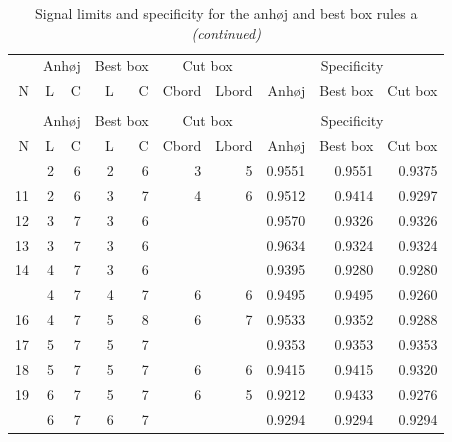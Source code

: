 \begin{Schunk}

\begin{longtable}{rrrrrrrrrr}
\caption{\label{tab:tab1}Signal limits and specificity for the anhøj and best box rules and 
        borders for the cut box rules. N = number of data points in chart.
        L = upper limit for longest run, C = lower limit for number of 
        crossings, Cbord and Lbord = cut box borders to keep.}\\
\toprule
\multicolumn{1}{c}{ } & \multicolumn{2}{c}{Anhøj} & \multicolumn{2}{c}{Best box} & \multicolumn{2}{c}{Cut box} & \multicolumn{3}{c}{Specificity} \\
\cmidrule(l{3pt}r{3pt}){2-3} \cmidrule(l{3pt}r{3pt}){4-5} \cmidrule(l{3pt}r{3pt}){6-7} \cmidrule(l{3pt}r{3pt}){8-10}
N & L & C & L & C & Cbord & Lbord & Anhøj & Best box & Cut box\\
\midrule
\endfirsthead
\caption[]{Signal limits and specificity for the anhøj and best box rules a \textit{(continued)}}\\
\toprule
\multicolumn{1}{c}{ } & \multicolumn{2}{c}{Anhøj} & \multicolumn{2}{c}{Best box} & \multicolumn{2}{c}{Cut box} & \multicolumn{3}{c}{Specificity} \\
\cmidrule(l{3pt}r{3pt}){2-3} \cmidrule(l{3pt}r{3pt}){4-5} \cmidrule(l{3pt}r{3pt}){6-7} \cmidrule(l{3pt}r{3pt}){8-10}
N & L & C & L & C & Cbord & Lbord & Anhøj & Best box & Cut box\\
\midrule
\endhead
\
\endfoot
\bottomrule
\endlastfoot
10 & 2 & 6 & 2 & 6 & 3 & 5 & 0.9551 & 0.9551 & 0.9375\\
11 & 2 & 6 & 3 & 7 & 4 & 6 & 0.9512 & 0.9414 & 0.9297\\
12 & 3 & 7 & 3 & 6 &  &  & 0.9570 & 0.9326 & 0.9326\\
13 & 3 & 7 & 3 & 6 &  &  & 0.9634 & 0.9324 & 0.9324\\
14 & 4 & 7 & 3 & 6 &  &  & 0.9395 & 0.9280 & 0.9280\\
\addlinespace
15 & 4 & 7 & 4 & 7 & 6 & 6 & 0.9495 & 0.9495 & 0.9260\\
16 & 4 & 7 & 5 & 8 & 6 & 7 & 0.9533 & 0.9352 & 0.9288\\
17 & 5 & 7 & 5 & 7 &  &  & 0.9353 & 0.9353 & 0.9353\\
18 & 5 & 7 & 5 & 7 & 6 & 6 & 0.9415 & 0.9415 & 0.9320\\
19 & 6 & 7 & 5 & 7 & 6 & 5 & 0.9212 & 0.9433 & 0.9276\\
\addlinespace
20 & 6 & 7 & 6 & 7 &  &  & 0.9294 & 0.9294 & 0.9294\\

\end{longtable}
\end{Schunk}
